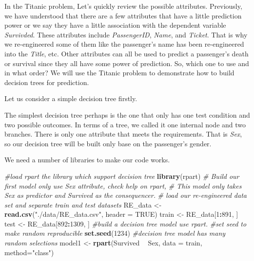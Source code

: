 \documentclass[
]{book}
\newenvironment{Shaded}{\begin{snugshade}}{\end{snugshade}}
\newcommand{\CommentTok}[1]{\textcolor[rgb]{0.56,0.35,0.01}{\textit{#1}}}
\newcommand{\DataTypeTok}[1]{\textcolor[rgb]{0.13,0.29,0.53}{#1}}
\newcommand{\DecValTok}[1]{\textcolor[rgb]{0.00,0.00,0.81}{#1}}
\newcommand{\KeywordTok}[1]{\textcolor[rgb]{0.13,0.29,0.53}{\textbf{#1}}}
\newcommand{\NormalTok}[1]{#1}
\newcommand{\OperatorTok}[1]{\textcolor[rgb]{0.81,0.36,0.00}{\textbf{#1}}}
\newcommand{\OtherTok}[1]{\textcolor[rgb]{0.56,0.35,0.01}{#1}}
\newcommand{\StringTok}[1]{\textcolor[rgb]{0.31,0.60,0.02}{#1}}
\begin{document}
In the Titanic problem, Let's quickly review the possible attributes. Previously, we have understood that there are a few attributes that have a little prediction power or we say they have a little association with the dependent variable \emph{Survivded}. These attributes include \emph{PassengerID}, \emph{Name}, and \emph{Ticket}. That is why we re-engineered some of them like the passenger's name has been re-engineered into the \emph{Title}, etc. Other attributes can all be used to predict a passenger's death or survival since they all have some power of prediction. So, which one to use and in what order? We will use the Titanic problem to demonstrate how to build decision trees for prediction.

Let us consider a simple decision tree firstly.

The simplest decision tree perhaps is the one that only has one test condition and two possible outcomes. In terms of a tree, we called it one internal node and two branches. There is only one attribute that meets the requirements. That is \emph{Sex}, so our decision tree will be built only base on the passenger's gender.

We need a number of libraries to make our code works.

\begin{Shaded}
\begin{Highlighting}[]
\CommentTok{#load rpart the library which support decision tree }
\KeywordTok{library}\NormalTok{(rpart)}
\CommentTok{# Build our first model only use Sex attribute, check help on rpart, }
\CommentTok{# This model only takes Sex as predictor and Survived as the consequencer.}
\CommentTok{# load our re-engineered data set and separate train and test datasets}
\NormalTok{RE_data <-}\StringTok{ }\KeywordTok{read.csv}\NormalTok{(}\StringTok{"./data/RE_data.csv"}\NormalTok{, }\DataTypeTok{header =} \OtherTok{TRUE}\NormalTok{)}
\NormalTok{train <-}\StringTok{ }\NormalTok{RE_data[}\DecValTok{1}\OperatorTok{:}\DecValTok{891}\NormalTok{, ]}
\NormalTok{test <-}\StringTok{ }\NormalTok{RE_data[}\DecValTok{892}\OperatorTok{:}\DecValTok{1309}\NormalTok{, ]}
\CommentTok{#build a decision tree model use rpart. }
\CommentTok{#set seed to make random reproducible}
\KeywordTok{set.seed}\NormalTok{(}\DecValTok{1234}\NormalTok{) }\CommentTok{#decision tree model has many random selections}
\NormalTok{model1 <-}\StringTok{ }\KeywordTok{rpart}\NormalTok{(Survived }\OperatorTok{~}\StringTok{ }\NormalTok{Sex, }\DataTypeTok{data =}\NormalTok{ train, }\DataTypeTok{method=}\StringTok{"class"}\NormalTok{)}
\end{Highlighting}
\end{Shaded}
\end{document}
